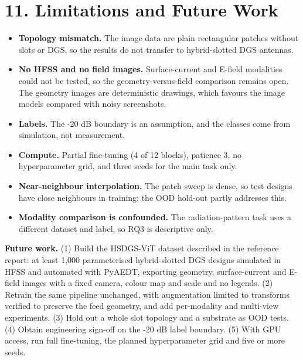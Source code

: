 \documentclass[11pt,a4paper]{article}
\begin{document}
\section*{11. Limitations and Future Work}
\begin{itemize}[leftmargin=*,itemsep=1pt]
\item \textbf{Topology mismatch.} The image data are plain rectangular patches without slots or DGS, so the results do not transfer to hybrid-slotted DGS antennas.
\item \textbf{No HFSS and no field images.} Surface-current and E-field modalities could not be tested, so the geometry-versus-field comparison remains open. The geometry images are deterministic drawings, which favours the image models compared with noisy screenshots.
\item \textbf{Labels.} The -20 dB boundary is an assumption, and the classes come from simulation, not measurement.
\item \textbf{Compute.} Partial fine-tuning (4 of 12 blocks), patience 3, no hyperparameter grid, and three seeds for the main task only.
\item \textbf{Near-neighbour interpolation.} The patch sweep is dense, so test designs have close neighbours in training; the OOD hold-out partly addresses this.
\item \textbf{Modality comparison is confounded.} The radiation-pattern task uses a different dataset and label, so RQ3 is descriptive only.
\end{itemize}
\textbf{Future work.} (1) Build the HSDGS-ViT dataset described in the reference report: at least 1,000 parameterised hybrid-slotted DGS designs simulated in HFSS and automated with PyAEDT, exporting geometry, surface-current and E-field images with a fixed camera, colour map and scale and no legends. (2) Retrain the same pipeline unchanged, with augmentation limited to transforms verified to preserve the feed geometry, and add per-modality and multi-view experiments. (3) Hold out a whole slot topology and a substrate as OOD tests. (4) Obtain engineering sign-off on the -20 dB label boundary. (5) With GPU access, run full fine-tuning, the planned hyperparameter grid and five or more seeds.
\end{document}
